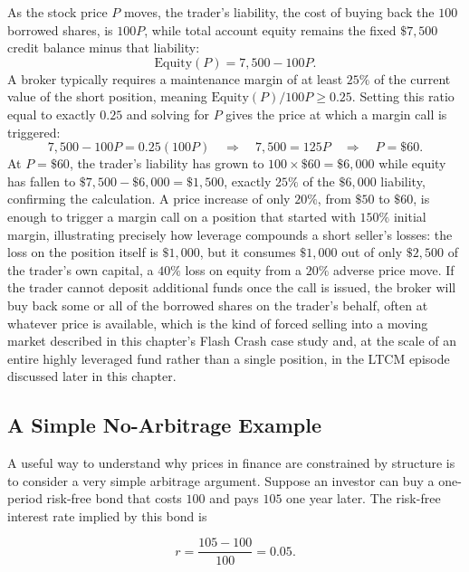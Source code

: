 \documentclass[../ai_in_finance]{subfiles}
\begin{document}
As the stock price $P$ moves, the trader's liability, the cost of buying back the $100$ borrowed shares, is $100P$, while total account equity remains the fixed $\$7{,}500$ credit balance minus that liability:
\begin{equation*}
\text{Equity}(P) = 7{,}500 - 100P.
\end{equation*}
A broker typically requires a maintenance margin of at least $25\%$ of the current value of the short position, meaning $\text{Equity}(P)/100P \geq 0.25$. Setting this ratio equal to exactly $0.25$ and solving for $P$ gives the price at which a margin call is triggered:
\begin{equation*}
7{,}500 - 100P = 0.25(100P) \quad\Longrightarrow\quad 7{,}500 = 125P \quad\Longrightarrow\quad P = \$60.
\end{equation*}
At $P=\$60$, the trader's liability has grown to $100 \times \$60 = \$6{,}000$ while equity has fallen to $\$7{,}500 - \$6{,}000 = \$1{,}500$, exactly $25\%$ of the $\$6{,}000$ liability, confirming the calculation. A price increase of only $20\%$, from $\$50$ to $\$60$, is enough to trigger a margin call on a position that started with $150\%$ initial margin, illustrating precisely how leverage compounds a short seller's losses: the loss on the position itself is $\$1{,}000$, but it consumes $\$1{,}000$ out of only $\$2{,}500$ of the trader's own capital, a $40\%$ loss on equity from a $20\%$ adverse price move. If the trader cannot deposit additional funds once the call is issued, the broker will buy back some or all of the borrowed shares on the trader's behalf, often at whatever price is available, which is the kind of forced selling into a moving market described in this chapter's Flash Crash case study and, at the scale of an entire highly leveraged fund rather than a single position, in the LTCM episode discussed later in this chapter.

\subsection{A Simple No-Arbitrage Example}
\label{sec:no-arbitrage}

A useful way to understand why prices in finance are constrained by structure is to consider a very simple arbitrage argument. Suppose an investor can buy a one-period risk-free bond that costs $100$ and pays $105$ one year later. The risk-free interest rate implied by this bond is

\begin{equation*}
r = \frac{105 - 100}{100} = 0.05.
\end{equation*}
\end{document}
